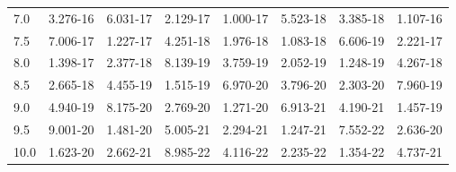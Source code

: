 \begin{table}
\begin{tabular}{llllllll}
7.0& 3.276-16& 6.031-17&
2.129-17& 1.000-17& 5.523-18& 3.385-18& 1.107-16\\
7.5& 7.006-17&
1.227-17& 4.251-18& 1.976-18& 1.083-18& 6.606-19& 2.221-17\\
8.0&
1.398-17& 2.377-18& 8.139-19& 3.759-19& 2.052-19& 1.248-19& 4.267-18\\
8.5&  2.665-18& 4.455-19& 1.515-19& 6.970-20& 3.796-20& 2.303-20&
7.960-19\\
9.0& 4.940-19& 8.175-20& 2.769-20& 1.271-20& 6.913-21&
4.190-21& 1.457-19\\
9.5& 9.001-20& 1.481-20& 5.005-21& 2.294-21&
1.247-21& 7.552-22& 2.636-20\\
10.0& 1.623-20& 2.662-21& 8.985-22&
4.116-22& 2.235-22& 1.354-22& 4.737-21\\
\hline
\end{tabular}
\end{table}

